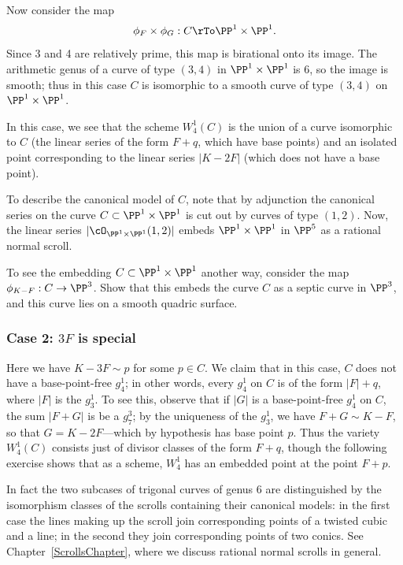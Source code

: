 Now consider the map
$$
\phi_F \times \phi_G : C \rTo \PP^1 \times \PP^1.
$$
Since 3 and 4 are relatively prime, this map is birational onto its image. The arithmetic genus of a curve of type $(3,4)$ in $\PP^1 \times \PP^1$ is 6, so the image is smooth; thus in this case $C$ is isomorphic to a smooth curve of type $(3,4)$ on $\PP^1 \times \PP^1$.

In this case, we see that the scheme $W^1_4(C)$ is the union of a curve isomorphic to $C$ (the linear series of the form $F + q$, which have base points) and an isolated point corresponding to the linear series $|K - 2F|$ (which does not have a base point).

To describe the canonical model of $C$, note that by adjunction the canonical series on the curve $C \subset \PP^1 \times \PP^1$ is cut out by curves of type $(1,2)$. Now, the linear series $|\cO_{\PP^1 \times \PP^1}(1,2)|$ embeds $\PP^1 \times \PP^1$ in $\PP^5$ as a rational normal scroll.

\begin{exercise}
To see the embedding $C \subset \PP^1 \times \PP^1$ another way, consider the map $\phi_{K-F} : C \to \PP^3$. Show that this embeds the curve $C$ as a septic curve in $\PP^3$, and this curve lies on a smooth quadric surface.
\end{exercise}

\subsubsection{Case 2: $3F$ is special}  Here we have $K - 3F \sim p$ for some $p \in C$. We claim that in this case, $C$ does not have a base-point-free $g^1_4$; in other words, every $g^1_4$ on $C$ is of the form $|F| + q$, where $|F|$ is the $g^1_3$. To see this, observe that if $|G|$ is a base-point-free $g^1_4$ on $C$, the sum $|F+G|$ is be a $g^3_7$; by the uniqueness of the $g^1_3$, we have $F+G \sim K - F$, so that $G = K-2F$---which by hypothesis has base point $p$. Thus the variety $W^1_4(C)$ consists just of divisor classes of the form $F+q$, though the following exercise shows that as a scheme, $W^1_4$ has an embedded point at the point $F+p$.

In fact  the two subcases of trigonal curves of genus 6 are distinguished by the isomorphism classes of the scrolls containing their canonical models: in the first case the lines making up the scroll join corresponding points of a twisted
cubic and a line; in the second they join corresponding points of two conics.
See Chapter~\ref{ScrollsChapter}, where we discuss rational normal scrolls in general.


